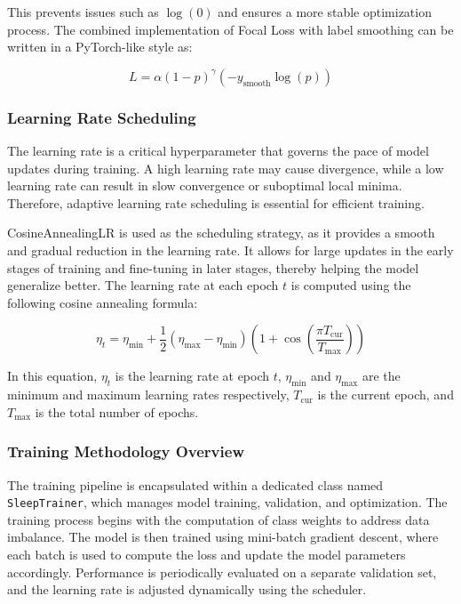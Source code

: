 This prevents issues such as $\log(0)$ and ensures a more stable optimization process. The combined implementation of Focal Loss with label smoothing can be written in a PyTorch-like style as:

\[
L = \alpha(1 - p)^{\gamma} \left( - y_{\text{smooth}} \log(p) \right)
\]

\subsubsection*{Learning Rate Scheduling}

The learning rate is a critical hyperparameter that governs the pace of model updates during training. A high learning rate may cause divergence, while a low learning rate can result in slow convergence or suboptimal local minima. Therefore, adaptive learning rate scheduling is essential for efficient training.

CosineAnnealingLR is used as the scheduling strategy, as it provides a smooth and gradual reduction in the learning rate. It allows for large updates in the early stages of training and fine-tuning in later stages, thereby helping the model generalize better. The learning rate at each epoch $t$ is computed using the following cosine annealing formula:

\[
\eta_t = \eta_{\min} + \frac{1}{2} (\eta_{\max} - \eta_{\min}) \left( 1 + \cos \left( \frac{\pi T_{\text{cur}}}{T_{\text{max}}} \right) \right)
\]

In this equation, $\eta_t$ is the learning rate at epoch $t$, $\eta_{\min}$ and $\eta_{\max}$ are the minimum and maximum learning rates respectively, $T_{\text{cur}}$ is the current epoch, and $T_{\text{max}}$ is the total number of epochs.

\subsubsection*{Training Methodology Overview}

The training pipeline is encapsulated within a dedicated class named \texttt{SleepTrainer}, which manages model training, validation, and optimization. The training process begins with the computation of class weights to address data imbalance. The model is then trained using mini-batch gradient descent, where each batch is used to compute the loss and update the model parameters accordingly. Performance is periodically evaluated on a separate validation set, and the learning rate is adjusted dynamically using the scheduler.

